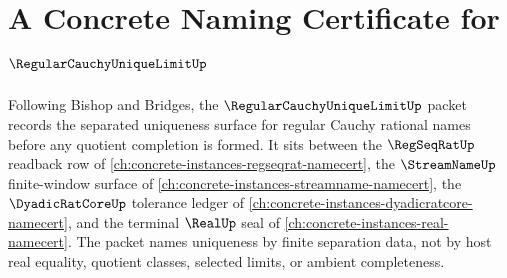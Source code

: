 \chapter{A Concrete Naming Certificate for $\RegularCauchyUniqueLimitUp$}
\label{ch:concrete-instances-regular-cauchy-unique-limit-namecert}

Following Bishop and Bridges, the $\RegularCauchyUniqueLimitUp$ packet records the separated uniqueness surface for regular Cauchy rational names before any quotient completion is formed. It sits between the $\RegSeqRatUp$ readback row of \autoref{ch:concrete-instances-regseqrat-namecert}, the $\StreamNameUp$ finite-window surface of \autoref{ch:concrete-instances-streamname-namecert}, the $\DyadicRatCoreUp$ tolerance ledger of \autoref{ch:concrete-instances-dyadicratcore-namecert}, and the terminal $\RealUp$ seal of \autoref{ch:concrete-instances-real-namecert}. The packet names uniqueness by finite separation data, not by host real equality, quotient classes, selected limits, or ambient completeness.

